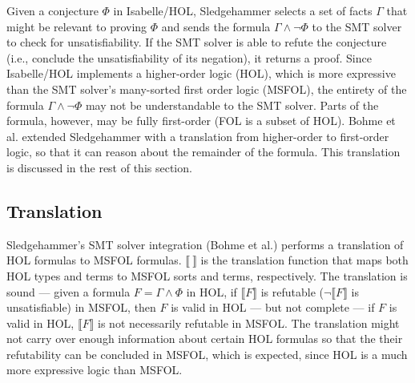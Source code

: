 \documentclass{article}
\begin{document}
	Given a conjecture $\Phi$ in 
	Isabelle/HOL, Sledgehammer 
	selects a set of facts 
	$\Gamma$ that might be relevant 
	to proving $\Phi$ and sends
	the formula $\Gamma \land \neg 
	\Phi$ to the SMT solver to check 
	for unsatisfiability. If the SMT 
	solver is able to refute the 
	conjecture (i.e., conclude 
	the unsatisfiability of its 
	negation), it returns 
	a proof. Since Isabelle/HOL 
	implements a higher-order logic 
	(HOL), which 
	is more expressive than 
	the SMT solver's many-sorted
	first order logic (MSFOL),
	the entirety of the formula
	$\Gamma \land \neg \Phi$ may not 
	be understandable to the SMT 
	solver. Parts of the formula,
	however, may be fully 
	first-order (FOL is 
	a subset of HOL). Bohme et al.
	extended Sledgehammer with 
	a translation from higher-order 
	to first-order logic, so that 
	it can reason about the remainder
	of the formula. This translation
	is discussed in the rest of this 
	section.
	
	\subsection{Translation}
	\label{sec:trans}
	Sledgehammer's SMT solver 
	integration (Bohme et al.) performs 
	a translation 
	of HOL formulas to MSFOL formulas.
	$\llbracket\ \rrbracket$
	is the translation function 
	that maps both HOL types and 
	terms to MSFOL sorts and terms,
	respectively.
	The translation is sound --- 
	given a formula 
	$F = \Gamma \land \Phi$ in HOL, if 
	$\llbracket F \rrbracket$ is refutable 
	($\neg \llbracket F \rrbracket$
	is unsatisfiable) in MSFOL, then 
	$F$	is valid in HOL --- but not 
	complete --- if $F$ is valid in 
	HOL, $\llbracket F \rrbracket$ is 
	not necessarily refutable in MSFOL. 
	The translation might not carry over 
	enough information about certain HOL 
	formulas so that the their 
	refutability can be concluded in 
	MSFOL, which is	expected, since HOL 
	is a much more expressive logic than 
	MSFOL. 
	
\end{document}
